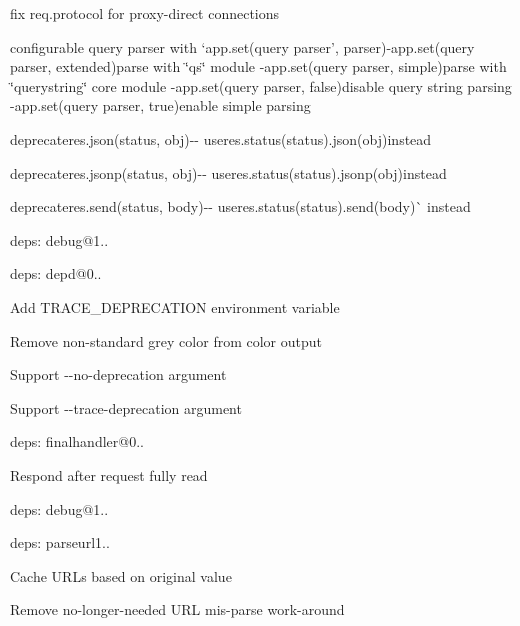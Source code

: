 {\ttfamily 
\begin{DoxyItemize}
\item fix {\ttfamily req.\+protocol} for proxy-\/direct connections
\item configurable query parser with `app.\+set(\textquotesingle{}query parser', parser){\ttfamily  -\/}app.\+set(\textquotesingle{}query parser\textquotesingle{}, \textquotesingle{}extended\textquotesingle{}){\ttfamily parse with \char`\"{}qs\char`\"{} module -\/}app.\+set(\textquotesingle{}query parser\textquotesingle{}, \textquotesingle{}simple\textquotesingle{}){\ttfamily parse with \char`\"{}querystring\char`\"{} core module -\/}app.\+set(\textquotesingle{}query parser\textquotesingle{}, false){\ttfamily disable query string parsing -\/}app.\+set(\textquotesingle{}query parser\textquotesingle{}, true){\ttfamily enable simple parsing}
\item {\ttfamily deprecate}res.\+json(status, obj){\ttfamily -\/-\/ use}res.\+status(status).json(obj){\ttfamily instead}
\item {\ttfamily deprecate}res.\+jsonp(status, obj){\ttfamily -\/-\/ use}res.\+status(status).jsonp(obj){\ttfamily instead}
\item {\ttfamily deprecate}res.\+send(status, body){\ttfamily -\/-\/ use}res.\+status(status).send(body)\`{} instead
\item deps\+: debug@1..
\item deps\+: depd@0..
\begin{DoxyItemize}
\item Add {\ttfamily T\+R\+A\+C\+E\+\_\+\+D\+E\+P\+R\+E\+C\+A\+T\+I\+ON} environment variable
\item Remove non-\/standard grey color from color output
\item Support {\ttfamily -\/-\/no-\/deprecation} argument
\item Support {\ttfamily -\/-\/trace-\/deprecation} argument
\end{DoxyItemize}
\item deps\+: finalhandler@0..
\begin{DoxyItemize}
\item Respond after request fully read
\item deps\+: debug@1..
\end{DoxyItemize}
\item deps\+: parseurl1..
\begin{DoxyItemize}
\item Cache U\+R\+Ls based on original value
\item Remove no-\/longer-\/needed U\+RL mis-\/parse work-\/around

\end{DoxyItemize}
\end{DoxyItemize}}
